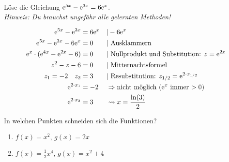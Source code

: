 



Löse die Gleichung $\mathrm{e}^{5x}-\mathrm{e}^{3x}=6\mathrm{e}^x$.\\
\textit{Hinweis: Du brauchst ungefähr alle gelernten Methoden!}
\begin{lsg}{}
	\begin{multicols}{2}
	\begin{align*}
		\e^{5x}-\e^{3x}&=6\e^x &&|-6\e^x\\
		\e^{5x}-\e^{3x}-6\e^x&=0 &&|\ \text{Ausklammern}\\
		\e^x\cdot(\e^{4x}-\e^{2x}-6)&=0 &&|\ \text{Nullprodukt und Substitution: } z=\e^{2x}\\
		z^2-z-6&=0 &&|\ \text{Mitternachtsformel}\\
		z_1=-2 \quad z_2&=3&&|\ \text{Resubstitution: } z_{1/2}=\e^{2\cdot x_{1/2}}\\
		\e^{2\cdot x_1}&=-2 &&\Rightarrow \text{nicht möglich ($\e^x$ immer $>0$)}\\
		\e^{2\cdot x_2}&= 3 &&\rightsquigarrow x=\frac{\ln(3)}{2}
	\end{align*}
	\end{multicols}
\end{lsg}
 In welchen Punkten schneiden sich die Funktionen?
\begin{multicols}{3}
  \begin{enumerate}
    \item $f(x) = x^2$, $g(x) = 2x$
    \item $f(x) = \frac 1 2 x^4$, $g(x) = x^2+4$
  \end{enumerate}
\end{multicols}

